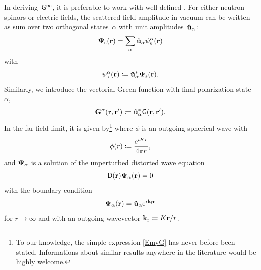 In deriving~$\mathsf{G}^\infty$, it is preferable to work with well-defined
.
%
For either neutron spinors or electric fields,
the scattered field amplitude in vacuum
can be written as sum over two orthogonal states~$\alpha$
%
with unit amplitudes~$\mathbf{\hat u}_\alpha$:
%
\begin{equation}
   \mathbf{\Psi}_\text{s}(\mathbf{r})
   = \sum_\alpha\mathbf{\hat u}_\alpha\psi_\text{s}^\alpha(\mathbf{r})
\end{equation}
with
\begin{equation}
  \psi_\text{s}^\alpha(\mathbf{r})
  \coloneqq \mathbf{\hat u}_\alpha^* \mathbf{\Psi}_\text{s}(\mathbf{r}).
\end{equation}
Similarly, we introduce the vectorial Green function with final polarization state~$\alpha$,
\begin{equation}
   \mathbf{G}^\alpha(\mathbf{r},\mathbf{r}')
   \coloneqq \mathbf{\hat u}_\alpha^* \mathsf{G}(\mathbf{r},\mathbf{r}').
\end{equation}
In the far-field limit, it is given by\footnote
{To our knowledge,
the simple expression \cref{EmyG} has never before been stated.
Informations about similar results anywhere in the literature would be highly welcome.}
where $\phi$ is an outgoing spherical wave with
\begin{equation}\label{Effphidef}
  \phi(r) \coloneqq \frac{\mathrm e^{iKr}}{4\pi r},
\end{equation}
and $\mathbf{\Psi}_\alpha$ is a solution of the unperturbed distorted wave equation
\begin{equation}
  \mathsf{D}(\mathbf{r})\mathbf{\Psi}_\alpha(\mathbf{r}) = 0
\end{equation}
with the boundary condition
\begin{equation}
  \mathbf{\Psi}_\alpha(\mathbf{r}) = \mathbf{\hat u}_\alpha\mathrm e^{i\mathbf{k}_{\text{f}}\mathbf{r}}
\end{equation}
for $r\to\infty$ and
with an outgoing wavevector
%
$\mathbf{k}_{\text{f}}\coloneqq K \mathbf{r} / r$.

